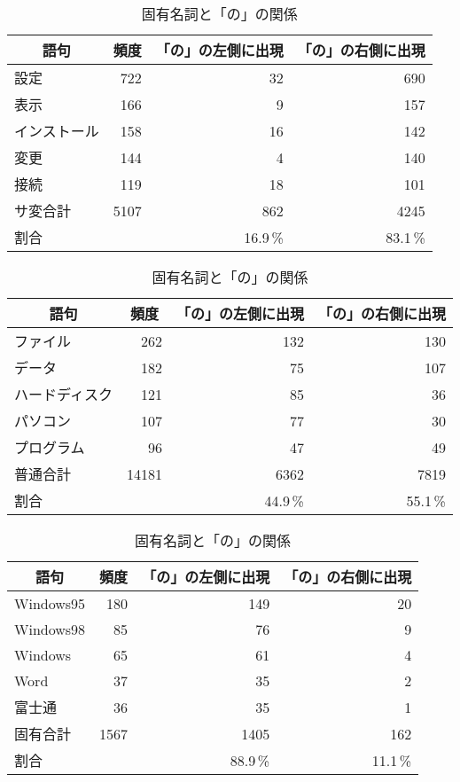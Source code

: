 \begin{table}[b]
 \caption{サ変名詞と「の」の関係}
 \label{tab:sano}
 \begin{center}
  \begin{tabular}{|l|r|r|r|} \hline
   \multicolumn{1}{|c|}{語句} & \multicolumn{1}{|c|}{頻度} & \multicolumn{1}{|c|}{「の」の左側に出現} & \multicolumn{1}{|c|}{「の」の右側に出現} \\ \hline \hline
   設定 & 722 & 32 & 690 \\ \hline
   表示 & 166 & 9 & 157 \\ \hline
   インストール & 158 & 16 & 142 \\ \hline
   変更 & 144 & 4 & 140 \\ \hline
   接続 & 119 & 18 & 101 \\ \hline \hline
   サ変合計 & 5107 & 862 & 4245 \\ \hline
   割合 & & 16.9\,\% & 83.1\,\% \\ \hline
  \end{tabular}
 \end{center}
 
 \caption{普通名詞と「の」の関係}
 \label{tab:funo}
 \begin{center}
  \begin{tabular}{|l|r|r|r|} \hline
   \multicolumn{1}{|c|}{語句} & \multicolumn{1}{|c|}{頻度} & \multicolumn{1}{|c|}{「の」の左側に出現} & \multicolumn{1}{|c|}{「の」の右側に出現} \\ \hline \hline
   ファイル & 262 & 132 & 130 \\ \hline
   データ & 182 & 75 & 107 \\ \hline
   ハードディスク & 121 & 85 & 36 \\ \hline
   パソコン & 107 & 77 & 30 \\ \hline
   プログラム & 96 & 47 & 49 \\ \hline \hline
   普通合計 & 14181 & 6362 & 7819 \\ \hline
   割合 && 44.9\,\% & 55.1\,\% \\ \hline
  \end{tabular}
 \end{center}

 \caption{固有名詞と「の」の関係}
 \label{tab:kono}
 \begin{center}
  \begin{tabular}{|l|r|r|r|} \hline
   \multicolumn{1}{|c|}{語句} & \multicolumn{1}{|c|}{頻度} & \multicolumn{1}{|c|}{「の」の左側に出現} & \multicolumn{1}{|c|}{「の」の右側に出現} \\ \hline \hline
   Windows95 & 180 & 149 & 20 \\ \hline
   Windows98 & 85 & 76 & 9 \\ \hline
   Windows & 65 & 61 & 4 \\ \hline
   Word & 37 & 35 & 2 \\ \hline
   富士通 & 36 & 35 & 1 \\ \hline \hline
   固有合計 & 1567 & 1405 & 162 \\ \hline
   割合 && 88.9\,\% & 11.1\,\% \\ \hline
  \end{tabular}
 \end{center}
\end{table}


